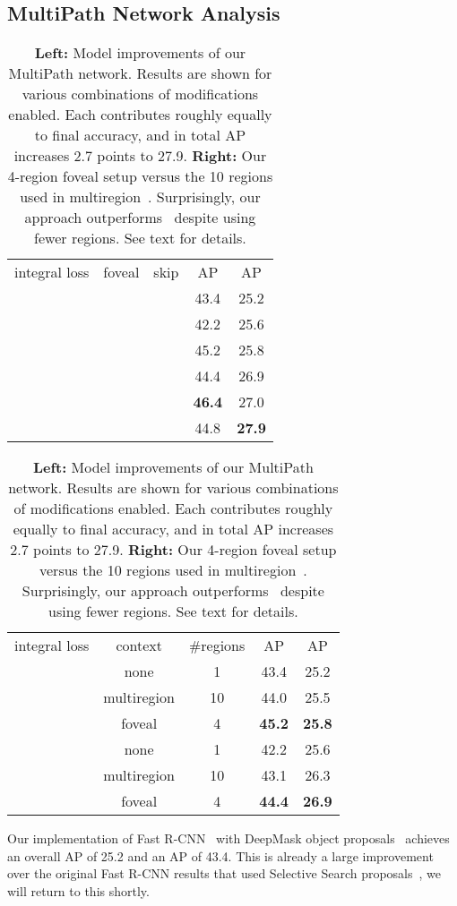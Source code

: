 \documentclass{bmvc2k}
\newcommand{\chk}{{\centering\checkmark}}
\newcommand{\Caption}[1]{\caption{\small#1}}
\newcommand{\AP}[1]{AP\xspace}
\begin{document}
\subsection{MultiPath Network Analysis}\label{sec:results:main}

\begin{table}[t]\centering\scriptsize
\renewcommand\arraystretch{1.1}\renewcommand{\tabcolsep}{2mm}
\begin{tabular}[t]{c c c | c c}
 integral loss & foveal & skip & \AP{50} & AP \\
 \shline
        &      &      & 43.4 & 25.2\\
   \chk &      &      & 42.2 & 25.6\\
        & \chk &      & 45.2 & 25.8\\
   \chk & \chk &      & 44.4 & 26.9\\
        & \chk & \chk & \textbf{46.4} & 27.0 \\
   \chk & \chk & \chk & 44.8 & \textbf{27.9} \\
\end{tabular}\hspace{10mm}
\begin{tabular}[t]{c c c | c c}
  integral loss & context & \#regions & \AP{50} & AP \\
  \shline
        & none        & 1  & 43.4 & 25.2 \\
        & multiregion & 10 & 44.0 & 25.5 \\
        & foveal      & 4  & \textbf{45.2} & \textbf{25.8} \\
  \hline
   \chk & none        & 1  & 42.2 & 25.6 \\
   \chk & multiregion & 10 & 43.1 & 26.3 \\
   \chk & foveal      & 4  & \textbf{44.4} & \textbf{26.9}
\end{tabular}
\Caption{\textbf{Left:} Model improvements of our MultiPath network. Results are shown for various combinations of modifications enabled. Each contributes roughly equally to final accuracy, and in total AP increases 2.7 points to 27.9. \textbf{Right:} Our 4-region foveal setup versus the 10 regions used in multiregion~\cite{gidaris2015object}. Surprisingly, our approach outperforms~\cite{gidaris2015object} despite using fewer regions. See text for details.}
\label{table:main}
\end{table}


Our implementation of Fast R-CNN~\cite{girshick15fastrcnn} with DeepMask object proposals~\cite{pinheiro2015learning} achieves an overall AP of 25.2 and an \AP{50} of 43.4. This is already a large improvement over the original Fast R-CNN results that used Selective Search proposals~\cite{Uijlings13}, we will return to this shortly.
\end{document}
